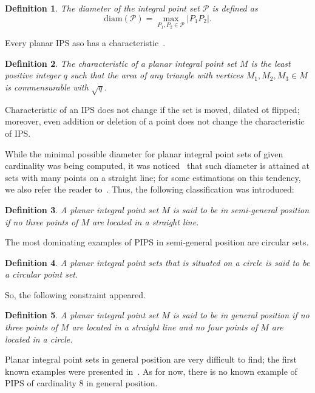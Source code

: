 \documentclass[12pt]{article}
\theoremstyle{theorem}
\theoremstyle{dfn}
\newtheorem{dfn}{Definition}
\theoremstyle{remark}
\begin{document}
\begin{dfn}
	The diameter of the integral point set $\mathcal{P}$ is defined as
	\begin{equation}
		\operatorname{diam(\mathcal{P})} = \underset{P_{1}, P_{2} \in
		\mathcal{P}}{\max} |P_{1}P_{2}|
		.
	\end{equation}
\end{dfn}

Every planar IPS aso has a characteristic~\cite{kemnitz1988punktmengen,kurz2005characteristic}.

\begin{dfn}
	The characteristic of a planar integral point set $M$ is the least positive integer $q$
	such that the area of any triangle with vertices $M_1, M_2, M_3 \in M$
	is commensurable with $\sqrt{q}$.
\end{dfn}
Characteristic of an IPS does not change if the set is moved, dilated ot flipped;
moreover, even addition or deletion of a point does not change the characteristic of IPS.


While the minimal possible diameter for planar integral point sets of given cardinality was being computed,
it was noticed~\cite{kurz2008minimum} that such diameter is attained at sets with many points on a straight line;
for some estimations on this tendency, we also refer the reader to~\cite{solymosi2003note}.
Thus, the following classification was introduced:
\begin{dfn}
	A planar integral point set $M$ is said to be in \emph{semi-general position}
	if no three points of $M$ are located in a straight line.
\end{dfn}

The most dominating examples of PIPS in semi-general position are circular sets.
\begin{dfn}
	A planar integral point sets that is situated on a circle is said to be a \textit{circular}
	point set.
\end{dfn}

So, the following constraint appeared.
\begin{dfn}
	A planar integral point set $M$ is said to be in \emph{general position}
	if no three points of $M$ are located in a straight line
	and no four points of $M$ are located in a circle.
\end{dfn}

Planar integral point sets in general position are very difficult to find;
the first known examples were presented in~\cite{kreisel2008heptagon}.
As for now, there is no known example of PIPS of cardinality 8 in general position.
\end{document}

